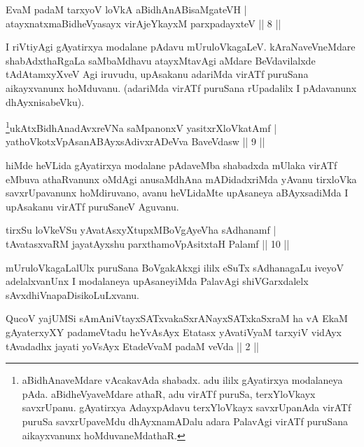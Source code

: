 \begin{shl}
EvaM padaM tarxyoV loVkA aBidhAnABisaMgateVH | \\
atayxnatxmaBidheVyasayx virAjeYkayxM parxpadayxteV \hfill ||  8 || 
\end{shl}

\begin{artha} 
I riVtiyAgi gAyatirxya modalane pAdavu mUruloVkagaLeV. 
kAraNaveVneMdare shabAdxthaRgaLa saMbaMdhavu atayxMtavAgi aMdare 
BeVdavilalxde tAdAtamxyXveV Agi iruvudu, upAsakanu adariMda virATf 
puruSana aikayxvanunx hoMduvanu. (adariMda virATf puruSana rUpadalilx 
I pAdavanunx dhAyxnisabeVku).
\end{artha}


\begin{shl}
\footnote{aBidhAnaveMdare vAcakavAda shabadx. adu ililx gAyatirxya modalaneya pAda. aBidheVyaveMdare athaR, adu virATf puruSa, terxYloVkayx savxrUpanu. gAyatirxya AdayxpAdavu terxYloVkayx savxrUpanAda virATf puruSa savxrUpaveMdu dhAyxnamADalu adara PalavAgi virATf puruSana aikayxvanunx hoMduvaneMdathaR.}ukAtxBidhAnadAvxreVNa saMpanonxV yasitxrXloVkatAmf | \\
yathoVkotxVpAsanABAyxsAdivxrADeVva BaveVdasw \hfill ||  9 || 
\end{shl}

\begin{artha} 
hiMde heVLida gAyatirxya modalane pAdaveMba shabadxda mUlaka virATf 
eMbuva athaRvanunx oMdAgi anusaMdhAna mADidadxriMda yAvanu tirxloVka 
savxrUpavanunx hoMdiruvano, avanu heVLidaMte upAsaneya aBAyxsadiMda I 
upAsakanu virATf puruSaneV Aguvanu.
\end{artha}


\begin{shl}
tirxSu loVkeVSu yAvatAsxyXtupxMBoVgAyeVha sAdhanamf  | \\
tAvatasxvaRM jayatAyxshu parxthamoVpAsitxtaH Palamf \hfill ||  10 ||
\end{shl}

\begin{artha} 
mUruloVkagaLalUlx puruSana BoVgakAkxgi ililx eSuTx sAdhanagaLu iveyoV 
adelalxvanUnx I modalaneya upAsaneyiMda PalavAgi shiVGarxdalelx 
sAvxdhiVnapaDisikoLuLxvanu.
\end{artha}

\begin{kandikeshl}
QucoV yajUMSi sAmAniVtayxSATxvakaSxrANayxSATxkaSxraM ha vA EkaM gAyaterxyXY padameVtadu heYvAsAyx Etatasx yAvatiVyaM tarxyiV vidAyx tAvadadhx jayati yoV\s sAyx EtadeVvaM padaM veVda || 2 ||
\end{kandikeshl}

